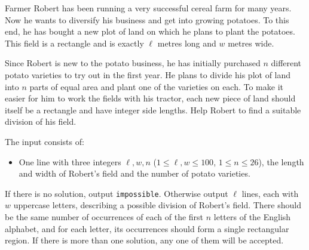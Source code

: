 
Farmer Robert has been running a very successful cereal farm for many years. Now
he wants to diversify his business and get into growing potatoes. To this end,
he has bought a new plot of land on which he plans to plant the potatoes. This
field is a rectangle and is exactly $\ell$ metres long and $w$ metres wide.

Since Robert is new to the potato business, he has initially purchased $n$
different potato varieties to try out in the first year. He plans to divide his
plot of land into $n$ parts of equal area and plant one of the varieties on
each. To make it easier for him to work the fields with his tractor, each new
piece of land should itself be a rectangle and have integer side lengths. Help
Robert to find a suitable division of his field.

\begin{Input}
  The input consists of:
  \begin{itemize}
    \item One line with three integers $\ell, w, n$ ($1 \le \ell,w \le 100$, $1 \le n \le 26$),
      the length and width of Robert's field and the number of potato varieties.
  \end{itemize}
\end{Input}

\begin{Output}
  If there is no solution, output \texttt{impossible}.
  Otherwise output $\ell$ lines, each with $w$ uppercase letters, describing a
  possible division of Robert's field. There should be the same number of
  occurrences of each of the first $n$ letters of the English alphabet, and for
  each letter, its occurrences should form a single rectangular region. If
  there is more than one solution, any one of them will be accepted.
\end{Output}

